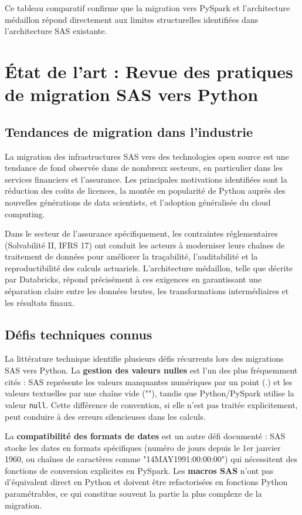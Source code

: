 Ce tableau comparatif confirme que la migration vers PySpark et l'architecture médaillon répond directement aux limites structurelles identifiées dans l'architecture SAS existante.

\section{État de l'art : Revue des pratiques de migration SAS vers Python}

\subsection{Tendances de migration dans l'industrie}

La migration des infrastructures SAS vers des technologies open source est une tendance de fond observée dans de nombreux secteurs, en particulier dans les services financiers et l'assurance. Les principales motivations identifiées sont la réduction des coûts de licences, la montée en popularité de Python auprès des nouvelles générations de data scientists, et l'adoption généralisée du cloud computing.

Dans le secteur de l'assurance spécifiquement, les contraintes réglementaires (Solvabilité II, IFRS 17) ont conduit les acteurs à moderniser leurs chaînes de traitement de données pour améliorer la traçabilité, l'auditabilité et la reproductibilité des calculs actuariels. L'architecture médaillon, telle que décrite par Databricks, répond précisément à ces exigences en garantissant une séparation claire entre les données brutes, les transformations intermédiaires et les résultats finaux.

\subsection{Défis techniques connus}

La littérature technique identifie plusieurs défis récurrents lors des migrations SAS vers Python. La \textbf{gestion des valeurs nulles} est l'un des plus fréquemment cités : SAS représente les valeurs manquantes numériques par un point (.) et les valeurs textuelles par une chaîne vide (""), tandis que Python/PySpark utilise la valeur \texttt{null}. Cette différence de convention, si elle n'est pas traitée explicitement, peut conduire à des erreurs silencieuses dans les calculs.

La \textbf{compatibilité des formats de dates} est un autre défi documenté : SAS stocke les dates en formats spécifiques (numéro de jours depuis le 1er janvier 1960, ou chaînes de caractères comme "14MAY1991:00:00:00") qui nécessitent des fonctions de conversion explicites en PySpark. Les \textbf{macros SAS} n'ont pas d'équivalent direct en Python et doivent être refactorisées en fonctions Python paramétrables, ce qui constitue souvent la partie la plus complexe de la migration.

